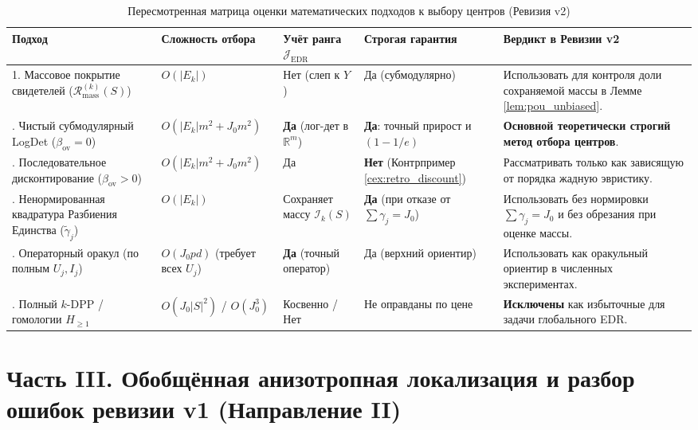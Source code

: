 \documentclass[11pt,a4paper]{article}
\newcommand{\R}{\mathbb{R}}
\newcommand{\JEDR}{\mathcal{J}_{\mathrm{EDR}}}
\newcommand{\II}{\mathcal{I}}
\theoremstyle{definition}
\theoremstyle{remark}
\begin{document}
\begin{table}[ht!]
\centering
\caption{Пересмотренная матрица оценки математических подходов к выбору центров (Ревизия v2)}
\label{tab:approaches_comparison}
\small
\begin{tabularx}{\textwidth}{@{}p{30mm}p{24mm}p{22mm}p{24mm}L@{}}
\toprule
\textbf{Подход} & \textbf{Сложность отбора} & \textbf{Учёт ранга $\JEDR$} & \textbf{Строгая гарантия} & \textbf{Вердикт в Ревизии v2} \\
. Массовое покрытие свидетелей ($\mathcal{R}_{\mathrm{mass}}^{(k)}(S)$) & $O(|E_k|)$ & Нет (слеп к $Y$) & Да (субмодулярно) & Использовать для контроля доли сохраняемой массы в Лемме \ref{lem:pou_unbiased}. \\
. Чистый субмодулярный LogDet ($\beta_{\mathrm{ov}}=0$) & $O(|E_k|m^2 + J_0 m^2)$ & \textbf{Да} (лог-дет в $\R^m$) & \textbf{Да}: точный прирост и $(1-1/e)$ & \textbf{Основной теоретически строгий метод отбора центров}. \\
. Последовательное дисконтирование ($\beta_{\mathrm{ov}}>0$) & $O(|E_k|m^2 + J_0 m^2)$ & Да & \textbf{Нет} (Контрпример \ref{cex:retro_discount}) & Рассматривать только как зависящую от порядка жадную эвристику. \\
. Ненормированная квадратура Разбиения Единства ($\tilde{\gamma}_j$) & $O(|E_k|)$ & Сохраняет массу $\II_k(S)$ & \textbf{Да} (при отказе от $\sum\gamma_j = J_0$) & Использовать без нормировки $\sum\gamma_j = J_0$ и без обрезания при оценке массы. \\
. Операторный оракул (по полным $U_j, I_j$) & $O(J_0 p d)$ (требует всех $U_j$) & \textbf{Да} (точный оператор) & Да (верхний ориентир) & Использовать как оракульный ориентир в численных экспериментах. \\
. Полный $k$-DPP / гомологии $H_{\ge 1}$ & $O(J_0 |S|^2)$ / $O(J_0^3)$ & Косвенно / Нет & Не оправданы по цене & \textbf{Исключены} как избыточные для задачи глобального EDR. \\
\bottomrule
\end{tabularx}
\end{table}

\section{Часть III. Обобщённая анизотропная локализация и разбор ошибок ревизии v1 (Направление II)}
\label{sec:part3}
\end{document}
